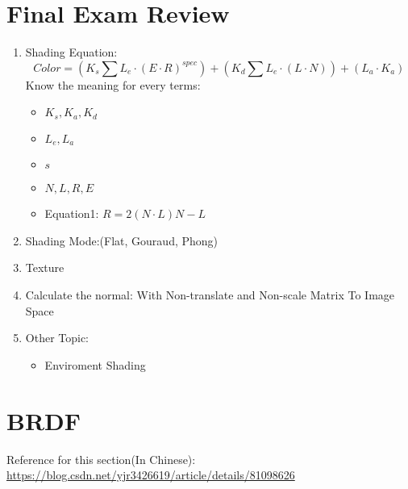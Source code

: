 \documentclass[cyan,normal,en]{elegantnote}
\begin{document}
\section{Final Exam Review}
\begin{enumerate}
	\item Shading Equation:
	$$Color=(K_s\sum{ L_e \cdot (E\cdot R)^{spec}}) + (K_d\sum{ L_e \cdot (L\cdot N)}) + (L_a \cdot K_a)$$
	Know the meaning for every terms:
	\begin{itemize}
		\item $K_s,K_a,K_d$
		\item $L_e,L_a$
		\item $s$
		\item $N,L,R,E$
		\item Equation1: $R=2(N\cdot L) N-L$
	\end{itemize}
	\item Shading Mode:(Flat, Gouraud, Phong)
	\item Texture
	\item Calculate the normal: With Non-translate and Non-scale Matrix To Image Space
	\item Other Topic:
	\begin{itemize}
		\item Enviroment Shading 
	\end{itemize}
\end{enumerate}
\newpage

\section{BRDF}

Reference for this section(In Chinese): \href{https://blog.csdn.net/yjr3426619/article/details/81098626}{https://blog.csdn.net/yjr3426619/article/details/81098626}
\end{document}
